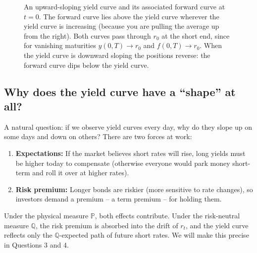 \documentclass[11pt]{article}
\newcommand{\PP}{\mathbb{P}}
\newcommand{\QQ}{\mathbb{Q}}
\begin{document}
\begin{figure}[ht]
\centering
{}
\caption{An upward-sloping yield curve and its associated forward curve at $t=0$.
The forward curve lies above the yield curve wherever the yield curve is
increasing (because you are pulling the average up from the right).  Both
curves pass through $r_0$ at the short end, since for vanishing maturities
$y(0,T)\to r_0$ and $f(0,T)\to r_0$.  When the yield curve is downward
sloping the positions reverse: the forward curve dips below the yield
curve.}
\end{figure}

\subsection{Why does the yield curve have a ``shape'' at all?}

A natural question: if we observe yield curves every day, why do they
slope up on some days and down on others?  There are two forces at work:

\begin{enumerate}
  \item \textbf{Expectations:} If the market believes short rates will rise,
  long yields must be higher today to compensate (otherwise everyone
  would park money short-term and roll it over at higher rates).
  \item \textbf{Risk premium:} Longer bonds are riskier (more sensitive to
  rate changes), so investors demand a premium -- a term premium -- for
  holding them.
\end{enumerate}

Under the physical measure $\PP$, both effects contribute.  Under the risk-neutral
measure $\QQ$, the risk premium is absorbed into the drift of $r_t$, and the
yield curve reflects only the $\QQ$-expected path of future short rates.
We will make this precise in Questions 3 and 4.
\end{document}
